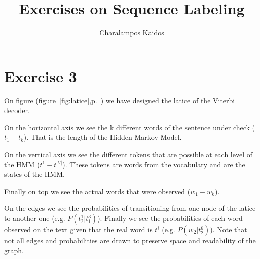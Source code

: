 \documentclass[a4paper]{article}
\begin{document}
\title{Exercises on Sequence Labeling}
\author{Charalampos Kaidos}

\maketitle

\section*{Exercise 3}

On figure (figure~\ref{fig:latice},p.~\pageref{fig:latice}) we have designed the
latice of the Viterbi decoder. 

On the horizontal axis we see the k different words of the sentence under check
($t_1 - t_k$). That is the length of the Hidden Markov Model.

On the vertical axis we see the different tokens that are possible at each level
of the HMM ($t^1 - t^{|V|}$). These tokens are words from the vocabulary and are
the states of the HMM.

Finally on top we see the actual words that were observed ($w_1 - w_k$).

On the edges we see the probabilities of transitioning from one node of the
latice to another one (e.g. $P(t_2^1|t_1^3)$). Finally we see the probabilities
of each word observed on the text given that the real word is $t^i$ (e.g.
$P(w_2|t_2^6)$). Note that not all edges and probabilities are drawn to preserve
space and readability of the graph.
\end{document}
